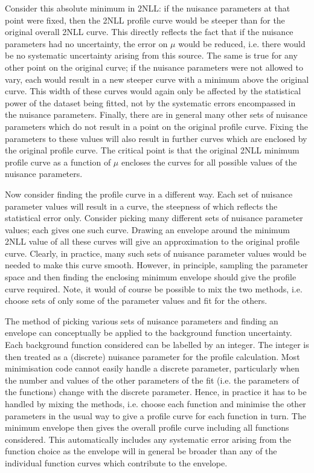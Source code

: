 Consider this absolute minimum in 2NLL: if the nuisance parameters at that
point were fixed, then the 2NLL profile curve would be steeper than for
the original overall 2NLL curve. This directly reflects the fact that
if the nuisance parameters had no uncertainty,
the error on $\mu$ would be reduced, i.e. there would be no systematic 
uncertainty arising from this source.
The same is true for any other point on the original curve; if the nuisance
parameters were not allowed to vary, each would result in a new steeper curve
with a minimum above the original curve.
This width of these curves would again only be affected by the statistical
power of the dataset being fitted, not by the systematic errors encompassed
in the nuisance parameters.
Finally, there are in general
many other sets of nuisance parameters which do not result in a point on the
original profile curve. Fixing the parameters to these values will also result
in further curves which are enclosed by the original profile curve.
The critical point is that the original 2NLL minimum profile curve as a function
of $\mu$ encloses the curves for all possible values of the nuisance
parameters.

Now consider finding the profile curve in a different way. Each set of nuisance
parameter values will result in a curve, the steepness of which reflects 
the statistical error only. Consider picking many different sets of nuisance
parameter values; each gives one such curve. Drawing an envelope around the
minimum 2NLL value of all these curves will give an approximation to the
original profile curve. Clearly, in practice, many such sets of nuisance
parameter values would be needed to make this curve smooth. However, in
principle, sampling the parameter space and then finding the enclosing
minimum envelope should give the profile curve required.
Note, it would of course be possible to mix the two methods, i.e.
choose sets of only some of the parameter values and fit for the others.

The method of picking various sets of nuisance parameters and finding
an envelope can conceptually be applied to the background function
uncertainty. Each background function considered can be labelled by an
integer. The integer is then treated as a (discrete) nuisance parameter
for the profile calculation.
Most minimisation
code cannot easily handle a discrete parameter, particularly when the
number and values of the other parameters of the fit (i.e. the parameters
of the functions) change with the discrete parameter.
Hence, in practice it has
to be handled by mixing the methods, i.e. choose each function and minimise
the other parameters in the usual way to give a profile curve for each function
in turn. The minimum envelope then gives the overall profile curve including
all functions considered. This automatically includes any systematic error
arising from the function choice as the envelope will in general be broader
than any of the individual function curves which contribute to the envelope.

